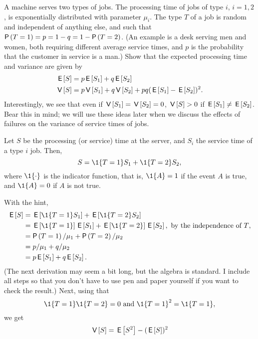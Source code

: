 \begin{extra}\label{ex:49}
  A machine serves two types of jobs.
  The processing time of jobs of type $i$, $i=1,2$, is exponentially distributed with parameter $\mu_i$.
  The type $T$ of a job is random and independent of anything else, and such that $\P{T=1} = p = 1-q = 1-\P{T=2}$.
  (An example is a desk serving men and women, both requiring different average service times, and $p$ is the probability that the customer in service is a man.)
  Show that the expected processing time and variance are given by
\begin{align*}
  \,\mathsf{E}\left[S\right] &= p \,\mathsf{E}\left[S_1\right]  + q \,\mathsf{E}\left[S_2\right] \\
\,\mathsf{V}\left[S\right] &= p \,\mathsf{V}\left[S_1\right] + q \,\mathsf{V}\left[S_2\right] + pq(\,\mathsf{E}\left[S_1\right] - \,\mathsf{E}\left[S_2\right])^2.
  \end{align*}
Interestingly, we see that even if $\,\mathsf{V}\left[S_1\right] = \,\mathsf{V}\left[S_2\right] = 0$, $\,\mathsf{V}\left[S\right] > 0$
if $\,\mathsf{E}\left[S_1\right] \neq \,\mathsf{E}\left[S_2\right]$. Bear this in mind; we will use these ideas
later when we discuss the effects of failures on the variance of
service times of jobs.
\begin{hint}
    Let $S$ be the processing (or service) time at the server, and
    $S_i$ the service time of a type $i$ job. Then, 
    \begin{equation*}
      S = \1{T=1} S_1 + \1{T=2} S_2,
    \end{equation*}
    where $\1{\cdot}$ is the indicator function, that is, $\1{A}=1$ if the
    event $A$ is true, and $\1{A}=0$ if $A$ is not true.   
\end{hint}
\begin{solution}
With the hint, 
\begin{align*}
  \E S 
&= \E{\1{T=1} S_1} + \E{\1{T=2} S_2} \\
&= \E{\1{T=1}} \E{ S_1} + \E{\1{T=2}} \E{S_2}, \text{ by the independence of $T$}, \\
&= \P{T=1} /\mu_1 + \P{T=2}/ \mu_2 \\
&= p /\mu_1 + q/ \mu_2 \\
&= p \E{S_1}  + q \E{S_2}.
\end{align*}
(The next derivation may seem a bit long, but the algebra is
standard. I include all steps so that you don't have to use pen and
paper yourself if you want to check the result.) Next, using that
\begin{equation*}
\1{T=1}\1{T=2} = 0 \text{ and } \1{T=1}^2 = \1{T=1},
\end{equation*}
we get
\begin{align*}
  \V S 
&= \E{S^2} - (\E S)^2 \\

\end{align*}
\end{solution}
\end{extra}
